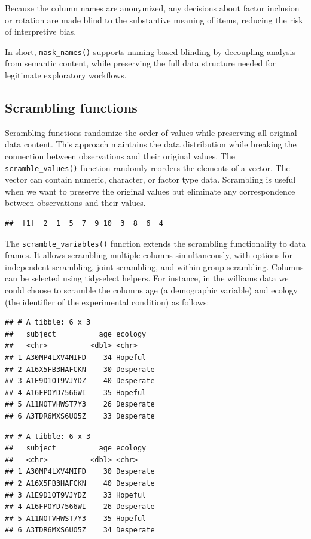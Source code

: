 \documentclass[
  english,
  man,floatsintext]{apa6}
\begin{document}
Because the column names are anonymized, any decisions about factor inclusion or rotation are made blind to the substantive meaning of items, reducing the risk of interpretive bias.

In short, \texttt{mask\_names()} supports naming-based blinding by decoupling analysis from semantic content, while preserving the full data structure needed for legitimate exploratory workflows.

\subsection{Scrambling functions}\label{scrambling-functions}

Scrambling functions randomize the order of values while preserving all original data content. This approach maintains the data distribution while breaking the connection between observations and their original values. The \texttt{scramble\_values()} function randomly reorders the elements of a vector. The vector can contain numeric, character, or factor type data. Scrambling is useful when we want to preserve the original values but eliminate any correspondence between observations and their values.

\begin{verbatim}
##  [1]  2  1  5  7  9 10  3  8  6  4
\end{verbatim}

The \texttt{scramble\_variables()} function extends the scrambling functionality to data frames. It allows scrambling multiple columns simultaneously, with options for independent scrambling, joint scrambling, and within-group scrambling. Columns can be selected using tidyselect helpers. For instance, in the williams data we could choose to scramble the columns age (a demographic variable) and ecology (the identifier of the experimental condition) as follows:

\begin{verbatim}
## # A tibble: 6 x 3
##   subject          age ecology  
##   <chr>          <dbl> <chr>    
## 1 A30MP4LXV4MIFD    34 Hopeful  
## 2 A16X5FB3HAFCKN    30 Desperate
## 3 A1E9D1OT9VJYDZ    40 Desperate
## 4 A16FPOYD7566WI    35 Hopeful  
## 5 A11NOTVHWST7Y3    26 Desperate
## 6 A3TDR6MXS6UO5Z    33 Desperate
\end{verbatim}

\begin{verbatim}
## # A tibble: 6 x 3
##   subject          age ecology  
##   <chr>          <dbl> <chr>    
## 1 A30MP4LXV4MIFD    30 Desperate
## 2 A16X5FB3HAFCKN    40 Desperate
## 3 A1E9D1OT9VJYDZ    33 Hopeful  
## 4 A16FPOYD7566WI    26 Desperate
## 5 A11NOTVHWST7Y3    35 Hopeful  
## 6 A3TDR6MXS6UO5Z    34 Desperate
\end{verbatim}
\end{document}
